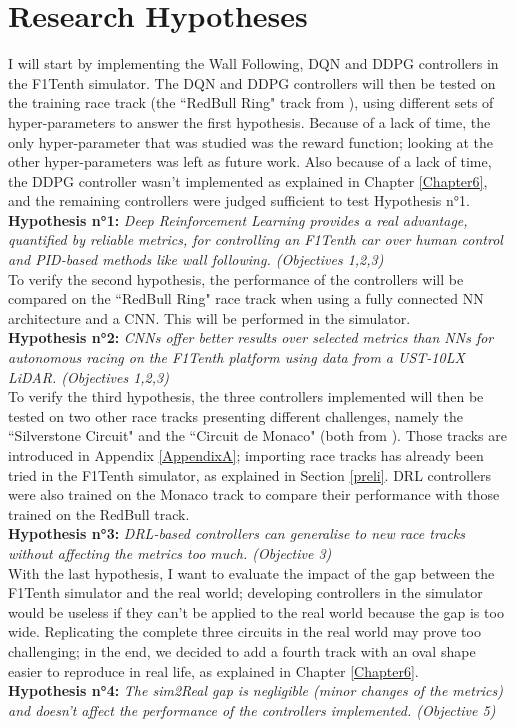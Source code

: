 \section{Research Hypotheses}
\label{reshypo}
I will start by implementing the Wall Following, DQN and DDPG controllers in the F1Tenth simulator. The DQN and DDPG controllers will then be tested on the training race track (the ``RedBull Ring" track from \cite{bosello}), using different sets of hyper-parameters to answer the first hypothesis. Because of a lack of time, the only hyper-parameter that was studied was the reward function; looking at the other hyper-parameters was left as future work. Also because of a lack of time, the DDPG controller wasn't implemented as explained in Chapter \ref{Chapter6}, and the remaining controllers were judged sufficient to test Hypothesis n°1. \\
\textbf{Hypothesis n°1:} \textit{Deep Reinforcement Learning provides a real advantage, quantified by reliable metrics, for controlling an F1Tenth car over human control and PID-based methods like wall following. (Objectives 1,2,3)} \\
To verify the second hypothesis, the performance of the controllers will be compared on the ``RedBull Ring" race track when using a fully connected NN architecture and a CNN. This will be performed in the simulator. \\
\textbf{Hypothesis n°2:} \textit{CNNs offer better results over selected metrics than NNs for autonomous racing on the F1Tenth platform using data from a UST-10LX LiDAR. (Objectives 1,2,3)}\\
To verify the third hypothesis, the three controllers implemented will then be tested on two other race tracks presenting different challenges, namely the ``Silverstone Circuit" and the ``Circuit de Monaco" (both from \cite{bosello}). Those tracks are introduced in Appendix \ref{AppendixA}; importing race tracks has already been tried in the F1Tenth simulator, as explained in Section \ref{preli}. DRL controllers were also trained on the Monaco track to compare their performance with those trained on the RedBull track.\\
\textbf{Hypothesis n°3:} \textit{DRL-based controllers can generalise to new race tracks without affecting the metrics too much. (Objective 3)} \\
With the last hypothesis, I want to evaluate the impact of the gap between the F1Tenth simulator and the real world; developing controllers in the simulator would be useless if they can't be applied to the real world because the gap is too wide. Replicating the complete three circuits in the real world may prove too challenging; in the end, we decided to add a fourth track with an oval shape easier to reproduce in real life, as explained in Chapter \ref{Chapter6}.\\
\textbf{Hypothesis n°4:} \textit{The sim2Real gap is negligible (minor changes of the metrics) and doesn't affect the performance of the controllers implemented. (Objective 5)}\\


